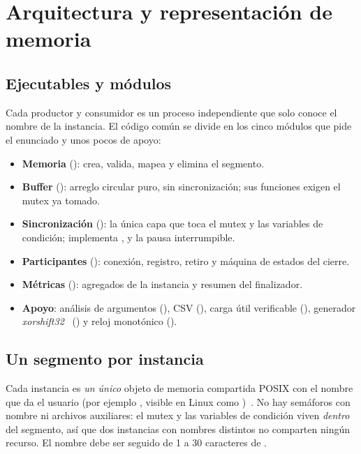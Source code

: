 \section{Arquitectura y representación de memoria}
\label{sec:arquitectura}

\subsection{Ejecutables y módulos}

Cada productor y consumidor es un proceso independiente que solo conoce el
nombre de la instancia. El código común se divide en los cinco módulos que
pide el enunciado y unos pocos de apoyo:

\begin{itemize}
  \item \textbf{Memoria} (): crea, valida, mapea y elimina
  el segmento.
  \item \textbf{Buffer} (): arreglo circular puro, sin
  sincronización; sus funciones exigen el mutex ya tomado.
  \item \textbf{Sincronización} (): la única capa que toca el
  mutex y las variables de condición; implementa ,  y
  la pausa interrumpible.
  \item \textbf{Participantes} (): conexión, registro,
  retiro y máquina de estados del cierre.
  \item \textbf{Métricas} (): agregados de la instancia y
  resumen del finalizador.
  \item \textbf{Apoyo}: análisis de argumentos (), CSV
  (), carga útil verificable (), generador
  \emph{xorshift32}~\cite{Marsaglia2003} () y reloj
  monotónico ().
\end{itemize}

\subsection{Un segmento por instancia}

Cada instancia es \emph{un único} objeto de memoria compartida POSIX con el
nombre que da el usuario (por ejemplo , visible en Linux
como )~\cite{POSIX2024}. No hay semáforos con
nombre ni archivos auxiliares: el mutex y las variables de condición viven
\emph{dentro} del segmento, así que dos instancias con nombres distintos no
comparten ningún recurso. El nombre debe ser \code{/} seguido de 1 a 30
caracteres de \code{[A-Za-z0-9\_-]}.

